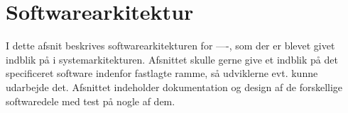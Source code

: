 
\chapter{Softwarearkitektur}


I dette afsnit beskrives softwarearkitekturen for ----, som der er blevet givet indblik på i systemarkitekturen. Afsnittet skulle gerne give et indblik på det specificeret software indenfor fastlagte ramme, så udviklerne evt. kunne udarbejde det. Afsnittet indeholder dokumentation og design af de forskellige softwaredele med test på nogle af dem. \\


